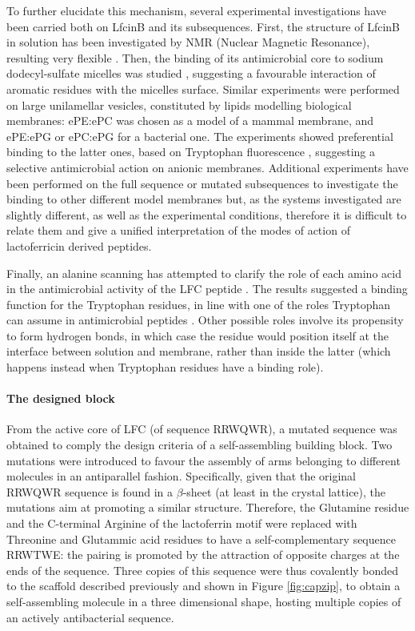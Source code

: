 To further elucidate this mechanism, several experimental investigations have been carried both on LfcinB and its subsequences. First, the structure of LfcinB in solution has been investigated by NMR (Nuclear Magnetic Resonance), resulting very flexible \citep{Hwang1998}. Then, the binding of its antimicrobial core to sodium dodecyl-sulfate micelles was studied \citep{Schibli1999}, suggesting a favourable interaction of aromatic residues with the micelles surface.
%
Similar experiments were performed on large unilamellar vesicles, constituted by lipids modelling biological membranes: ePE:ePC was chosen as a model of a mammal membrane, and ePE:ePG or ePC:ePG for a bacterial one. The experiments showed preferential binding to the latter ones, based on Tryptophan fluorescence \citep{Nguyen2005}, suggesting a selective antimicrobial action on anionic membranes.
%
Additional experiments have been performed on the full sequence or mutated subsequences \citep{Tsutsumi2012,Arseneault2010} to investigate the binding to other different model membranes but, as the systems investigated are slightly different, as well as the experimental conditions, therefore it is difficult to relate them and give a unified interpretation of the modes of action of lactoferricin derived peptides.

Finally, an alanine scanning has attempted to clarify the role of each amino acid in the antimicrobial activity of the LFC peptide \citep{Strom2002}. The results suggested a binding function for the Tryptophan residues, in line with one of the roles Tryptophan can assume in antimicrobial peptides \citep{Chan2006}. Other possible roles involve its propensity to form hydrogen bonds, in which case the residue would position itself at the interface between solution and membrane, rather than inside the latter (which happens instead when Tryptophan residues have a binding role).

\paragraph{The designed block}
From the active core of LFC (of sequence RRWQWR), a mutated sequence was obtained to comply the design criteria of a self-assembling building block. Two mutations were introduced to favour the assembly of arms belonging to different molecules in an antiparallel fashion. Specifically, given that the original RRWQWR sequence is found in a $\beta$-sheet (at least in the crystal lattice), the mutations aim at promoting a similar structure. Therefore, the Glutamine residue and the C-terminal Arginine of the lactoferrin motif were replaced with Threonine and Glutammic acid residues to have a self-complementary sequence RRWTWE: the pairing is promoted by the attraction of opposite charges at the ends of the sequence.
%
Three copies of this sequence were thus covalently bonded to the scaffold described previously and shown in Figure \ref{fig:capzip}, to obtain a self-assembling molecule in a three dimensional shape, hosting multiple copies of an actively antibacterial sequence.

